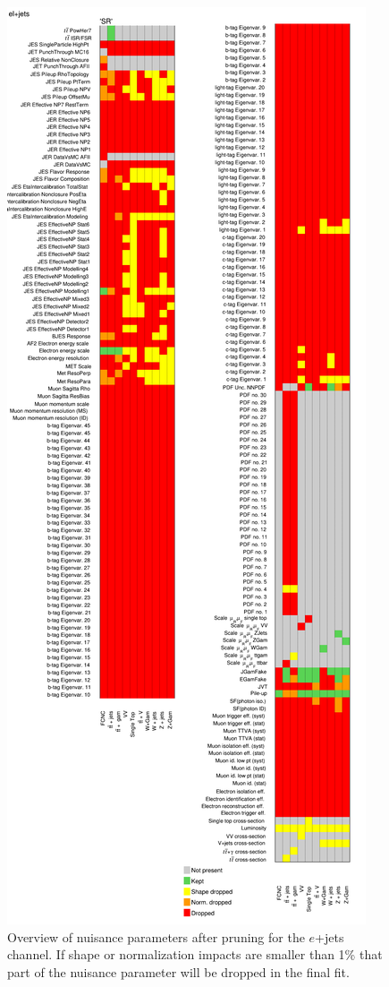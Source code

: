 \begin{figure}[h!]
	\centering
	\includegraphics[width=.5\columnwidth]{../ThesisImages/RegionPlots/FinalRegions/Systematics/MQGamEJetPHptMJet/FCNC_All_ejets/Pruning.png}
	\caption[Nuisance parameters after pruning for $e$+jets channel]{Overview of nuisance parameters after pruning for the $e$+jets channel.  If shape or normalization impacts are smaller than 1\% that part of the nuisance parameter will be dropped in the final fit.}
	\label{fig:Pruningejets}
\end{figure}


